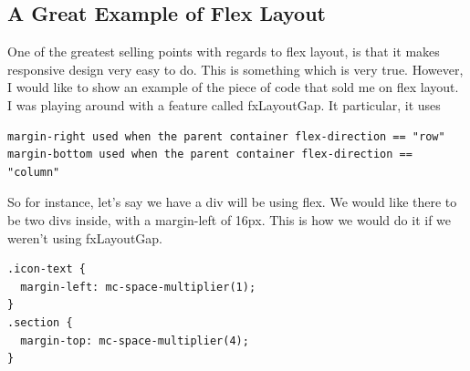 \subsection{ A Great Example of Flex Layout }

One of the greatest selling points with regards to flex layout, is that it makes
responsive design very easy to do. This is something which is very true.
However, I would like to show an example of the piece of code that sold me on
flex layout. I was playing around with a feature called fxLayoutGap. It
particular, it uses
\begin{verbatim}
margin-right used when the parent container flex-direction == "row"
margin-bottom used when the parent container flex-direction == "column"
\end{verbatim}

So for instance, let's say we have a div will be using flex. We would like
there to be two divs inside, with a margin-left of 16px. This is how we would
do it if we weren't using fxLayoutGap.
\begin{lstlisting}
.icon-text {
  margin-left: mc-space-multiplier(1);
}
.section {
  margin-top: mc-space-multiplier(4);
}
\end{lstlisting}


